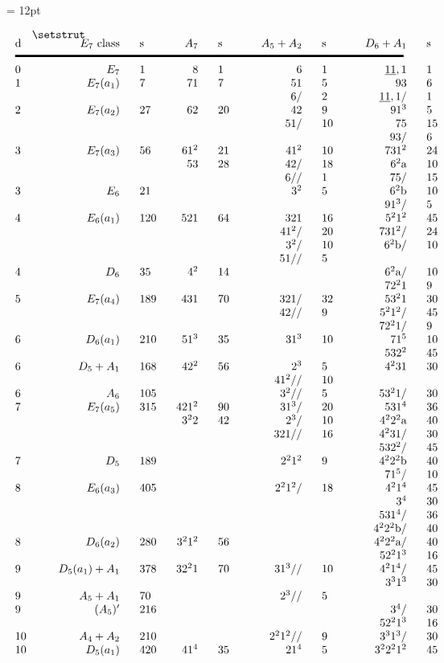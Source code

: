\baselineskip = 12pt

$$
\vbox{
\setstrut
\offinterlineskip
%
			\tabskip = 0pt plus 1fil
\halign to \hsize{
	#\hfil		\tabskip = 1.0 cm&	%
	\hfil #		\tabskip = 0.5 cm&	%
	#\hfil		\tabskip = 0.25cm&	%
	\strut#		\tabskip = 0.25cm&	%
	\hfil #		\tabskip = 0.5 cm&	%
	#\hfil		\tabskip = 1.0 cm&	%
	\hfil #		\tabskip = 0.5 cm&	%
	#\hfil		\tabskip = 1.0 cm&  %
	\hfil #		\tabskip = 0.5 cm&	%
	#\hfil		\tabskip = 0pt plus 1fil\cr	%
d&  $E_7$ class&  s& \omit& $A_7$&  s&  $A_5 + A_2$&  s&  $D_6+A_1$&
				s\cr\noalign{\vskip 0.2cm
				 	 		\hrule height 2pt
							\vskip 0.2cm}
0&  $E_7$&  1&&  8&  1&  6&  1& $\underline{11},1$& 1\cr
1&  $E_7(a_1)$&  7&&  71&  7&  51&  5& 93& 6\cr
&&&&&&  6/&  2& $\underline{11},1$/& 1\cr
2&  $E_7(a_2)$&  27&&  62&  20&  42&  9& $91^3$& 5\cr
&&&&&&  51/&  10& 75& 15\cr
&&&&&&&& 93/& 6\cr
3&  $E_7(a_3)$&  56&&  $61^2$&  21&  $41^2$&  10& $731^2$& 24\cr
&&&&  53&  28&  42/&  18& $6^2$a& 10\cr
&&&&&&  6//&  1& 75/& 15\cr
3&  $E_6$&  21&&&&  $3^2$&  5& $6^2$b& 10\cr
&&&&&&&& $91^3$/& 5\cr
4&  $E_6(a_1)$&  120&&  521&  64&  321&  16& $5^21^2$& 45\cr
&&&&&&  $41^2$/&  20& $731^2$/& 24\cr
&&&&&&  $3^2$/&  10& $6^2$b/& 10\cr
&&&&&&  51//&  5&&\cr
4&  $D_6$&  35&&  $4^2$&  14&&& $6^2$a/& 10\cr
&&&&&&&& $72^21$& 9\cr
5&  $E_7(a_4)$&  189&&  431&  70&  321/&  32& $53^21$& 30\cr
&&&&&&  42//&  9& $5^21^2$/& 45\cr
&&&&&&&& $72^21$/& 9\cr
6&  $D_6(a_1)$&  210&&  $51^3$&  35&  $31^3$&  10& $71^5$& 10\cr
&&&&&&&& $532^2$& 45\cr
6&  $D_5+A_1$&  168&&  $42^2$&  56&  $2^3$&  5& $4^231$& 30\cr
&&&&&&  $41^2$//&  10&&\cr
6&  $A_6$&  105&&&&  $3^2$//&  5& $53^21$/& 30\cr
7&  $E_7(a_5)$&  315&&  $421^2$&  90&  $31^3$/&  20& $531^4$& 36\cr
&&&&  $3^22$&  42&  $2^3$/&  10& $4^22^2$a& 40\cr
&&&&&&  321//&  16& $4^231$/& 30\cr
&&&&&&&& $532^2$/& 45\cr
7&  $D_5$&  189&&&&  $2^21^2$&  9& $4^22^2$b& 40\cr
&&&&&&&& $71^5$/& 10\cr
8&  $E_6(a_3)$&  405&&&&  $2^21^2$/&  18& $4^21^4$& 45\cr
&&&&&&&& $3^4$& 30\cr
&&&&&&&& $531^4$/& 36\cr
&&&&&&&& $4^22^2$b/& 40\cr
8&  $D_6(a_2)$&  280&&  $3^21^2$&  56&&& $4^22^2$a/& 40\cr
&&&&&&&& $52^21^3$&  16\cr
9&  $D_5(a_1)+A_1$&  378&&  $32^21$&  70&  $31^3$//&  10& $4^21^4$/& 45\cr
&&&&&&&& $3^31^3$& 30\cr
9&  $A_5+A_1$&  70&&&&  $2^3$//&  5&&\cr
9&  $(A_5)^\prime$&  216&&&&&& $3^4$/& 30\cr
&&&&&&&& $52^21^3$&  16\cr
10&  $A_4+A_2$&  210&&&&  $2^21^2$//&  9& $3^31^3$/& 30\cr
10&  $D_5(a_1)$&  420&&  $41^4$&  35&  $21^4$&  5& $3^22^21^2$& 45\cr
}%
}$$%

